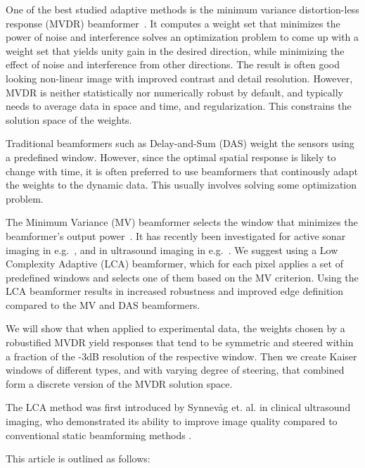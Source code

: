 \documentclass[10pt,journal,draftclsnofoot,onecolumn]{IEEEtran}
\newcommand\1{\vec 1}
\begin{document}
One of the best studied adaptive methods is the minimum variance distortion-less response (MVDR) beamformer~\cite{Capon1969}. It computes a weight set that minimizes the power of noise and interference solves an optimization problem to come up with a weight set that yields unity gain in the desired direction, while minimizing the effect of noise and interference from other directions. The result is often good looking non-linear image with improved contrast and detail resolution. However, MVDR is neither statistically nor numerically robust by default, and typically needs to average data in space and time, and regularization. This constrains the solution space of the weights.

Traditional beamformers such as Delay-and-Sum (DAS) weight the sensors using a predefined window. However, since the optimal spatial response is likely to change with time, it is often preferred to use beamformers that continously adapt the weights to the dynamic data. This usually involves solving some optimization problem.

The Minimum Variance (MV) beamformer selects the window that minimizes the beamformer's output power~\cite{cap69}. It has recently been investigated for active sonar imaging in e.g.~\cite{saf09}, and in ultrasound imaging in e.g.~\cite{syn07}. We suggest using a Low Complexity Adaptive (LCA) beamformer, which for each pixel applies a set of predefined windows and selects one of them based on the MV criterion. Using the LCA beamformer results in increased robustness and improved edge definition compared to the MV and DAS beamformers.

We will show that when applied to experimental data, the weights chosen by a robustified MVDR yield responses that tend to be symmetric and steered within a fraction of the -3dB resolution of the respective window. Then we create Kaiser windows of different types, and with varying degree of steering, that combined form a discrete version of the MVDR solution space. 

The LCA method was first introduced by Synnevåg et. al. in clinical ultrasound imaging, who demonstrated its ability to improve image quality compared to conventional static beamforming methods \cite{Synnevag2007}. 

This article is outlined as follows:

\end{document}
